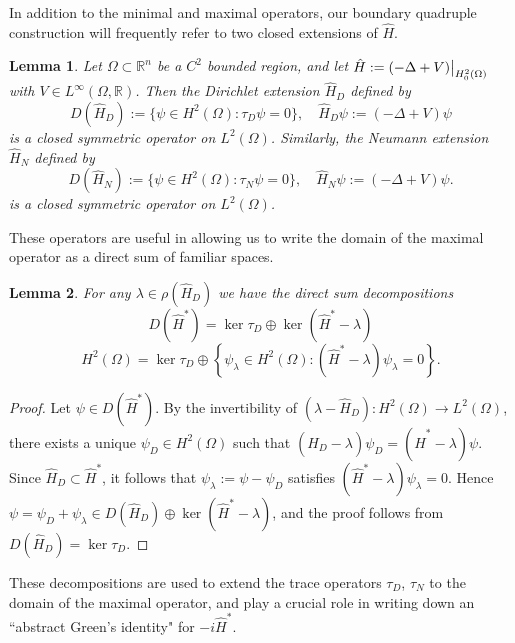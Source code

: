 \documentclass{article}
\numberwithin{equation}{section}
\newtheorem{lemma}{Lemma}[section]
\begin{document}
\par
In addition to the minimal and maximal operators, our boundary quadruple construction will frequently refer to two closed extensions of $\hat{H}$.
\begin{lemma}
    Let $\Omega\subset \mathbb{R}^n$ be a $C^2$ bounded region, and let $\hat{H}:=(-\Delta+V)\big{|}_{H^2_0(\Omega)}$ with $V \in L^\infty(\Omega,\mathbb{R})$. Then the \textit{Dirichlet} extension $\hat{H}_D$ defined by
    \begin{equation}
    D(\hat{H}_D):= \{ \psi \in H^2(\Omega):  \tau_D \psi=0\}, \quad \hat{H}_D \psi:=(-\Delta+V)\psi
\end{equation}
is a closed symmetric operator on $L^2(\Omega)$. Similarly, the Neumann extension $\hat{H}_N$ defined by 
    \begin{equation}
    D(\hat{H}_N):= \{ \psi \in H^2(\Omega):  \tau_N \psi=0\}, \quad \hat{H}_N \psi:=(-\Delta+V)\psi.
\end{equation}
is a closed symmetric operator on $L^2(\Omega)$.
\end{lemma}
These operators are useful in allowing us to write the domain of the maximal operator as a direct sum of familiar spaces.
\begin{lemma}\label{Direct Sum}
    For any $\lambda \in \rho(\hat{H}_D)$ we have the direct sum decompositions
    \begin{equation}\label{Dirichlet Star Decomp}
        D(\hat{H}^*)= \ker \tau_D \oplus \ker(\hat{H}^*-\lambda)
    \end{equation}
\begin{equation}\label{Dirichlet Decomp}
        H^2(\Omega)= \ker \tau_D \oplus \left\{ \psi_{\lambda} \in H^2(\Omega):(\hat{H}^*-\lambda)\psi_{\lambda}=0\right\}.
    \end{equation}
\end{lemma}
\begin{proof}
    Let $\psi \in D(\hat{H}^*)$. By the invertibility of $(\lambda-\hat{H}_D):H^2(\Omega) \to L^2(\Omega)$, there exists a unique $\psi_D\in H^2(\Omega)$ such that $(\hat{H}_D-\lambda)\psi_D=(\hat{H}^*-\lambda)\psi$. Since $\hat{H}_D\subset \hat{H}^*$, it follows that $\psi_\lambda:=\psi-\psi_D$ satisfies $(\hat{H}^*-\lambda)\psi_\lambda=0$. Hence $\psi=\psi_D+\psi_\lambda \in D(\hat{H}_D)\oplus \ker(\hat{H}^*-\lambda)$, and the proof follows from $D(\hat{H}_D)=\ker\tau_D$.
\end{proof}
These decompositions are used to extend the trace operators $\tau_D$, $\tau_N$ to the domain of the maximal operator, and play a crucial role in writing down an ``abstract Green's identity" for $-i\hat{H}^*$.
\end{document}
